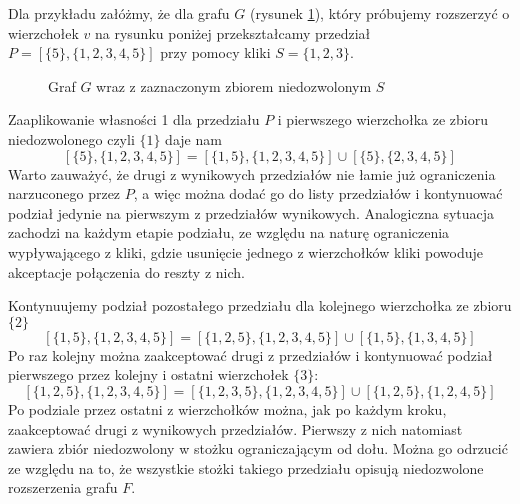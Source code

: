 Dla przykładu załóżmy, że dla grafu $G$ (rysunek \ref{SKlika}), który próbujemy rozszerzyć o wierzchołek $v$ na rysunku poniżej przekształcamy przedział $P =[\{5\},\{1,2,3,4,5\}]$ przy pomocy kliki $S = \{1,2,3\}$.
\begin{figure}[H]
  \centering
    \caption{Graf $G$ wraz z zaznaczonym zbiorem niedozwolonym $S$}
    \label{SKlika}
 \end{figure}
 

 Zaaplikowanie własności 1 dla przedziału $P$ i pierwszego wierzchołka ze zbioru niedozwolonego czyli $\{1\}$ daje nam  
$$[\{5\},\{1,2,3,4,5\}] = [\{1,5\},\{1,2,3,4,5\}] \cup [\{5\},\{2,3,4,5\}]$$ 
Warto zauważyć, że drugi z wynikowych przedziałów nie łamie już ograniczenia narzuconego przez $P$, a więc można dodać go do listy przedziałów i kontynuować podział jedynie na pierwszym z przedziałów wynikowych. Analogiczna sytuacja zachodzi na każdym etapie podziału, ze względu na naturę ograniczenia wypływającego z kliki, gdzie usunięcie jednego z wierzchołków kliki powoduje akceptacje połączenia do reszty z nich. 

Kontynuujemy podział pozostałego przedziału dla kolejnego wierzchołka ze zbioru $\{2\}$
$$[\{1,5\},\{1,2,3,4,5\}] = [\{1,2,5\},\{1,2,3,4,5\}] \cup [\{1,5\},\{1,3,4,5\}]$$ 
Po raz kolejny można zaakceptować drugi z przedziałów i kontynuować podział pierwszego przez kolejny i ostatni wierzchołek $\{3\}$: 
$$[\{1,2,5\},\{1,2,3,4,5\}] = [\{1,2,3,5\},\{1,2,3,4,5\}] \cup [\{1,2,5\},\{1,2,4,5\}]$$
Po podziale przez ostatni z wierzchołków można, jak po każdym kroku, zaakceptować drugi z wynikowych przedziałów. Pierwszy z nich natomiast zawiera zbiór niedozwolony w stożku ograniczającym od dołu. Można go odrzucić ze względu na to, że wszystkie stożki takiego przedziału opisują niedozwolone rozszerzenia grafu $F$.

